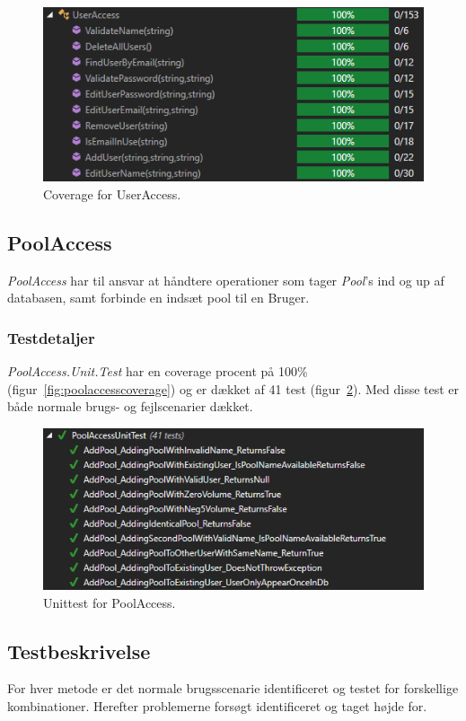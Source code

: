 \begin{figure}[h]
	\centering
	\includegraphics[width=0.7\linewidth]{figs/test/useraccesscoverage}
	\caption{Coverage for UserAccess.}
	\label{fig:useraccesscoverage}
\end{figure} 


\subsection{PoolAccess}
\textit{PoolAccess} har til ansvar at håndtere operationer som tager \textit{Pool}'s ind og up af databasen, samt forbinde en indsæt pool til en Bruger. 

\subsubsection{Testdetaljer}
\textit{PoolAccess.Unit.Test} har en coverage procent på 100\% (figur~\ref{fig:poolaccesscoverage}) og er dækket af 41 test (figur~\ref{fig:poolaccessunittest}). Med disse test er både normale brugs- og fejlscenarier dækket.

\begin{figure}[h]
	\centering
	\includegraphics[width=0.8\linewidth]{figs/test/poolaccessunittest}
	\caption{Unittest for PoolAccess.}
	\label{fig:poolaccessunittest}
\end{figure}

\subsection{Testbeskrivelse}
For hver metode er det normale brugsscenarie identificeret og testet for forskellige kombinationer. Herefter problemerne forsøgt identificeret og taget højde for.

